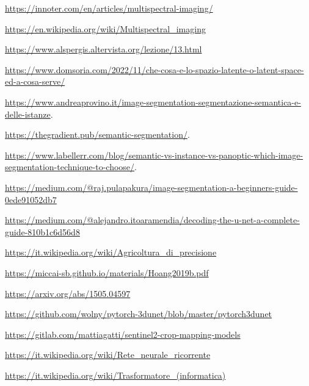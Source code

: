 \begin{thebibliography}{99}
\url{https://innoter.com/en/articles/multispectral-imaging/}

\url{https://en.wikipedia.org/wiki/Multispectral_imaging}

\url{https://www.alspergis.altervista.org/lezione/13.html}


\url{https://www.domsoria.com/2022/11/che-cosa-e-lo-spazio-latente-o-latent-space-ed-a-cosa-serve/}



\url{https://www.andreaprovino.it/image-segmentation-segmentazione-semantica-e-delle-istanze}.

\url{https://thegradient.pub/semantic-segmentation/}.

\url{https://www.labellerr.com/blog/semantic-vs-instance-vs-panoptic-which-image-segmentation-technique-to-choose/}.

\url{https://medium.com/@raj.pulapakura/image-segmentation-a-beginners-guide-0ede91052db7}


\url{https://medium.com/@alejandro.itoaramendia/decoding-the-u-net-a-complete-guide-810b1c6d56d8}

\url{https://it.wikipedia.org/wiki/Agricoltura_di_precisione}

\url{https://miccai-sb.github.io/materials/Hoang2019b.pdf}

\url{https://arxiv.org/abs/1505.04597}

\url{https://github.com/wolny/pytorch-3dunet/blob/master/pytorch3dunet}

\url{https://gitlab.com/mattiagatti/sentinel2-crop-mapping-models}

\url{https://it.wikipedia.org/wiki/Rete_neurale_ricorrente}

\url{https://it.wikipedia.org/wiki/Trasformatore_(informatica)}


\end{thebibliography}
